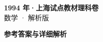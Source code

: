 \documentclass[zihao=-4, a4paper]{ctexart}
\begin{document}
\begin{center}
  {\Large\bfseries 1994 年·上海试点教材理科卷}\\[4pt]
  {\large 数学 · 解析版}
\end{center}
\medskip
{}

\clearpage
{}
\begin{center}{\Large\bfseries 参考答案与详细解析}\end{center}
\medskip

\end{document}
